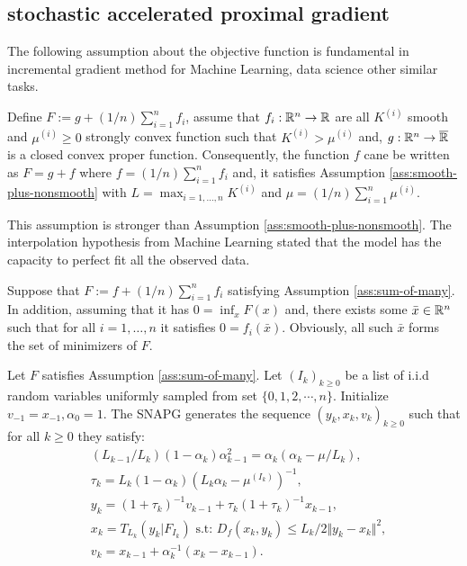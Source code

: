 \documentclass[12pt]{article}
\begin{document}
    
    \subsection{stochastic accelerated proximal gradient}
        The following assumption about the objective function is fundamental in incremental gradient method for Machine Learning, data science other similar tasks. 
        \begin{assumption}\label{ass:sum-of-many}
            Define $F := g + (1/n)\sum_{i = 1}^{n} f_i$, assume that $f_i:\mathbb R^n \rightarrow  \mathbb R$ are all $K^{(i)}$ smooth and $\mu^{(i)} \ge 0$ strongly convex function such that $K^{(i)} > \mu^{(i)}$ and, $g:\mathbb R^n \rightarrow \overline {\mathbb R}$ is a closed convex proper function. 
            Consequently, the function $f$ cane be written as $F = g + f$ where $f = (1/n)\sum_{i = 1}^{n} f_i$ and, it satisfies Assumption \ref{ass:smooth-plus-nonsmooth} with $L = \max_{i = 1, \ldots, n}K^{(i)}$ and $\mu = (1/n)\sum_{i = 1}^{n}\mu^{(i)}$. 
        \end{assumption}
        This assumption is stronger than Assumption \ref{ass:smooth-plus-nonsmooth}. 
        The interpolation hypothesis from Machine Learning stated that the model has the capacity to perfect fit all the observed data. 
        \begin{assumption}\label{ass:interp-hypothesis}
            Suppose that $F := f + (1/n)\sum_{i = 1}^{n} f_i$ satisfying Assumption \ref{ass:sum-of-many}. 
            In addition, assuming that it has $0 = \inf_{x}F(x)$ and, there exists some $\bar x \in \mathbb R^n$ such that for all $i = 1, \ldots, n$ it satisfies $0 = f_i(\bar x)$. 
            Obviously, all such $\bar x$ forms the set of minimizers of $F$. 
        \end{assumption}

        \begin{definition}[SNAPG-V2]\label{def:snapg-v2}
            Let $F$ satisfies Assumption \ref{ass:sum-of-many}. 
            Let $(I_k)_{k \ge 0}$ be a list of i.i.d random variables uniformly sampled from set $\{0, 1, 2, \cdots, n\}$. 
            Initialize $v_{-1} = x_{-1}, \alpha_0 = 1$. 
            The SNAPG generates the sequence $(y_k, x_k, v_k)_{k \ge 0}$ such that for all $k \ge 0$ they satisfy: 
            \begin{align*}
                & (L_{k - 1}/L_k)(1 - \alpha_{k})\alpha_{k - 1}^2 = \alpha_{k}\left(\alpha_{k} - \mu/L_k\right), \\
                & \tau_k = L_k(1 - \alpha_k)\left(L_k \alpha_k - \mu^{(I_k)}\right)^{-1}, \\
                & y_k = (1 + \tau_k)^{-1}v_{k - 1} + \tau_k(1 + \tau_k)^{-1}x_{k - 1}, \\
                & x_k =  T_{L_k}(y_k | F_{I_k}) \text{ s.t: } D_f(x_k, y_k) \le L_k/2\Vert y_k - x_k\Vert^2, \\
                & v_k = x_{k - 1} + \alpha_k^{-1}(x_k - x_{k - 1}). 
            \end{align*}
        \end{definition}
\end{document}
